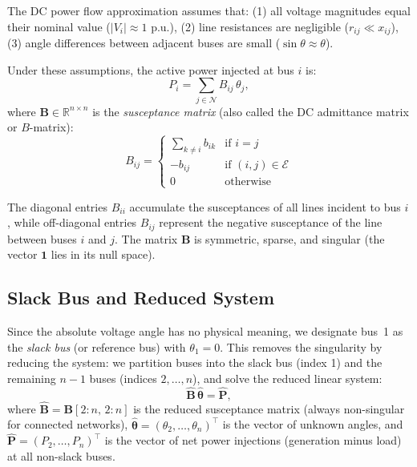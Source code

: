 The DC power flow approximation assumes that:
(1) all voltage magnitudes equal their nominal value ($|V_i| \approx 1$ p.u.),
(2) line resistances are negligible ($r_{ij} \ll x_{ij}$),
(3) angle differences between adjacent buses are small ($\sin\theta \approx \theta$).

Under these assumptions, the active power injected at bus $i$ is:
\begin{equation}
    P_i = \sum_{j \in \mathcal{N}} B_{ij}\,\theta_j,
    \label{eq:dc_power_balance}
\end{equation}
where $\mathbf{B} \in \mathbb{R}^{n \times n}$ is the \emph{susceptance matrix} (also called the DC admittance matrix or $B$-matrix):
\begin{equation}
    B_{ij} = \begin{cases}
        \sum_{k \neq i} b_{ik} & \text{if } i = j \\
        -b_{ij}               & \text{if } (i,j) \in \mathcal{E} \\
        0                      & \text{otherwise}
    \end{cases}
    \label{eq:B_matrix}
\end{equation}

The diagonal entries $B_{ii}$ accumulate the susceptances of all lines incident to bus $i$, while off-diagonal entries $B_{ij}$ represent the negative susceptance of the line between buses $i$ and $j$. The matrix $\mathbf{B}$ is symmetric, sparse, and singular (the vector $\mathbf{1}$ lies in its null space).

\subsection{Slack Bus and Reduced System}

Since the absolute voltage angle has no physical meaning, we designate bus~1 as the \emph{slack bus} (or reference bus) with $\theta_1 = 0$. This removes the singularity by reducing the system: we partition buses into the slack bus (index 1) and the remaining $n-1$ buses (indices $2,\ldots,n$), and solve the reduced linear system:
\begin{equation}
    \hat{\mathbf{B}}\,\hat{\boldsymbol{\theta}} = \hat{\mathbf{P}},
    \label{eq:dc_reduced}
\end{equation}
where $\hat{\mathbf{B}} = \mathbf{B}[2:n,\,2:n]$ is the reduced susceptance matrix (always non-singular for connected networks), $\hat{\boldsymbol{\theta}} = (\theta_2, \ldots, \theta_n)^\top$ is the vector of unknown angles, and $\hat{\mathbf{P}} = (P_2, \ldots, P_n)^\top$ is the vector of net power injections (generation minus load) at all non-slack buses.

